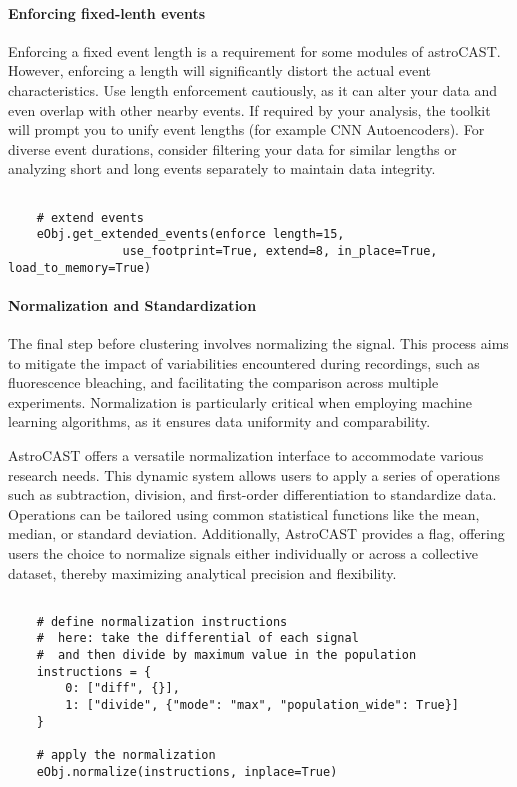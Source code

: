 \paragraph{Enforcing fixed-lenth events}
\label{par:enforcing-length}
Enforcing a fixed event length is a requirement for some modules of astroCAST. However, enforcing a length will significantly distort the actual event characteristics. Use length enforcement cautiously, as it can alter your data and even overlap with other nearby events. If required by your analysis, the toolkit will prompt you to unify event lengths (for example \ac{CNN} Autoencoders). For diverse event durations, consider filtering your data for similar lengths or analyzing short and long events separately to maintain data integrity.

\begin{lstlisting}[style=pyStyle]

    # extend events
    eObj.get_extended_events(enforce length=15,
                use_footprint=True, extend=8, in_place=True, load_to_memory=True)

\end{lstlisting}

\paragraph{Normalization and Standardization}
The final step before clustering involves normalizing the signal. This process aims to mitigate the impact of variabilities encountered during recordings, such as fluorescence bleaching, and facilitating the comparison across multiple experiments. Normalization is particularly critical when employing machine learning algorithms, as it ensures data uniformity and comparability.

AstroCAST offers a versatile normalization interface to accommodate various research needs. This dynamic system allows users to apply a series of operations such as subtraction, division, and first-order differentiation to standardize data. Operations can be tailored using common statistical functions like the mean, median, or standard deviation. Additionally, AstroCAST provides a  flag, offering users the choice to normalize signals either individually or across a collective dataset, thereby maximizing analytical precision and flexibility.

\begin{lstlisting}[style=pyStyle]

    # define normalization instructions
    #  here: take the differential of each signal
    #  and then divide by maximum value in the population
    instructions = {
        0: ["diff", {}],
        1: ["divide", {"mode": "max", "population_wide": True}]
    }

    # apply the normalization
    eObj.normalize(instructions, inplace=True)

\end{lstlisting}

